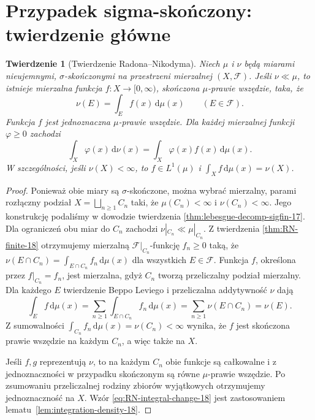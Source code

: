 \documentclass[11pt,a4paper,oneside]{book}
\numberwithin{equation}{chapter}
\theoremstyle{plain}
\newtheorem{twierdzenie}{Twierdzenie}[chapter]
\theoremstyle{definition}
\theoremstyle{remark}
\begin{document}
\section{Przypadek sigma-skończony: twierdzenie główne}
\begin{twierdzenie}[Twierdzenie Radona--Nikodyma]
\label{thm:RN-sigfin-18}
Niech $\mu$ i $\nu$ będą miarami nieujemnymi,
$\sigma$-skończonymi na przestrzeni mierzalnej $(X,\mathcal F)$.
Jeśli $\nu\ll\mu$, to istnieje mierzalna funkcja
$f:X\to[0,\infty)$, skończona $\mu$-prawie wszędzie,
taka, że
\begin{equation}\label{eq:RN-general-18}
\nu(E)=\int_E f(x)\,\mathrm d\mu(x)
\qquad(E\in\mathcal F).
\end{equation}
Funkcja $f$ jest jednoznaczna $\mu$-prawie wszędzie.
Dla każdej mierzalnej funkcji $\varphi\ge0$ zachodzi
\begin{equation}\label{eq:RN-integral-change-18}
\int_X\varphi(x)\,\mathrm d\nu(x)
=\int_X\varphi(x)f(x)\,\mathrm d\mu(x).
\end{equation}
W szczególności, jeśli $\nu(X)<\infty$, to
$f\in L^1(\mu)$ i $\int_Xf\,\mathrm d\mu(x)=\nu(X)$.
\end{twierdzenie}
\begin{proof}
Ponieważ obie miary są $\sigma$-skończone,
można wybrać mierzalny, parami rozłączny podział
$X=\bigsqcup_{n\ge1}C_n$ taki, że
$\mu(C_n)<\infty$ i $\nu(C_n)<\infty$.
Jego konstrukcję podaliśmy w dowodzie twierdzenia
\ref{thm:lebesgue-decomp-sigfin-17}.
Dla ograniczeń obu miar do $C_n$ zachodzi
$\nu|_{C_n}\ll\mu|_{C_n}$. Z twierdzenia
\ref{thm:RN-finite-18} otrzymujemy mierzalną
$\mathcal F|_{C_n}$-funkcję $f_n\ge0$ taką, że
$\nu(E\cap C_n)=\int_{E\cap C_n}f_n\,\mathrm d\mu(x)$
dla wszystkich $E\in\mathcal F$.
Funkcja $f$, określona przez $f|_{C_n}=f_n$,
jest mierzalna, gdyż $C_n$ tworzą przeliczalny
podział mierzalny. Dla każdego $E$ twierdzenie
Beppo Leviego i przeliczalna addytywność $\nu$ dają
\[
\int_E f\,\mathrm d\mu(x)
=\sum_{n\ge1}\int_{E\cap C_n}f_n\,\mathrm d\mu(x)
=\sum_{n\ge1}\nu(E\cap C_n)=\nu(E).
\]
Z sumowalności $\int_{C_n}f_n\,\mathrm d\mu(x)=\nu(C_n)<\infty$
wynika, że $f$ jest skończona prawie wszędzie na każdym
$C_n$, a więc także na $X$.

Jeśli $f,g$ reprezentują $\nu$, to na każdym $C_n$
obie funkcje są całkowalne i z jednoznaczności w
przypadku skończonym są równe $\mu$-prawie wszędzie.
Po zsumowaniu przeliczalnej rodziny zbiorów wyjątkowych
otrzymujemy jednoznaczność na $X$.
Wzór \eqref{eq:RN-integral-change-18} jest zastosowaniem
lematu~\ref{lem:integration-density-18}.
\end{proof}
\end{document}
